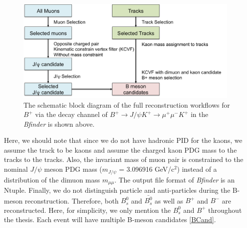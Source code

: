 \begin{figure}[h]
\begin{center}
\includegraphics[width= 0.98\textwidth]{Figures/Chapter5/BPmesonWorkflow.png}
\caption{The schematic block diagram of the full reconstruction workflows for $B^+$ via the decay channel of $B^+ \rightarrow J/\psi K^+ \rightarrow \mu^+\mu^- K^+$ in the \textit{Bfinder} is shown above.}
\label{BPRECOWF}
\end{center}
\end{figure}

Here, we should note that since we do not have hadronic PID for the kaons, we assume the track to be kaons and assume the charged kaon PDG mass to the tracks \cite{AlphaTheoEx} to the tracks. Also, the invariant mass of muon pair is constrained to the nominal $J/\psi$ meson PDG mass ($m_{J/\psi}$ = 3.096916 GeV/c$^2$) \cite{AlphaTheoEx} instead of a distribution of the dimuon mass $m_{\mu\mu}$. The output file format of \textit{Bfinder} is an Ntuple. Finally, we do not distinguish particle and anti-particles during the B-meson reconstruction. Therefore, both $B^0_s$ and $\bar{B^0_s}$ as well as $B^+$ and $B^-$ are reconstructed. Here, for simplicity, we only mention the $B^0_s$ and $B^+$ throughout the thesis. Each event will have multiple B-meson candidates \ref{BCand}.

